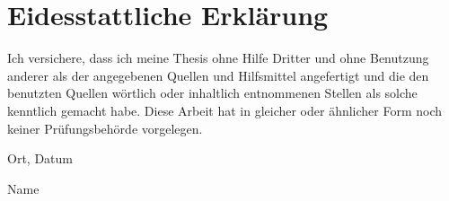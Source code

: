 \chapter*{Eidesstattliche Erklärung}
\thispagestyle{empty}
Ich versichere, dass ich meine Thesis ohne Hilfe Dritter und ohne Benutzung anderer als der angegebenen Quellen und Hilfsmittel angefertigt und die den benutzten Quellen wörtlich oder inhaltlich entnommenen Stellen als solche kenntlich gemacht habe. Diese Arbeit hat in gleicher oder ähnlicher Form noch keiner Prüfungsbehörde vorgelegen.
\bigskip

\raggedright{Ort, Datum} \bigskip \bigskip \bigskip

Name